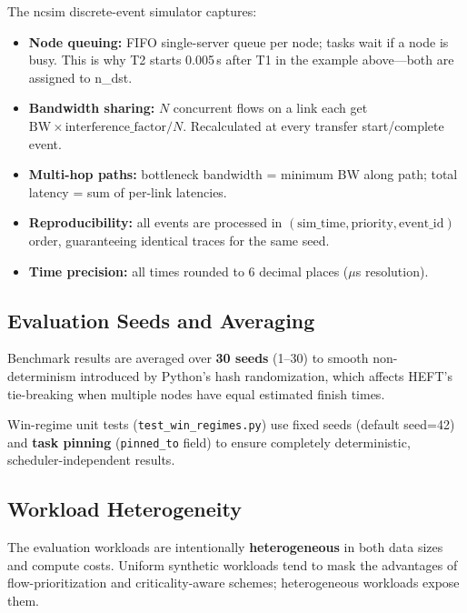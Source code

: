 \documentclass[11pt]{article}
\begin{document}
The ncsim discrete-event simulator captures:
\begin{itemize}
  \item \textbf{Node queuing:} FIFO single-server queue per node; tasks wait
        if a node is busy.  This is why T2 starts 0.005\,s after T1 in the
        example above---both are assigned to n\_dst.
  \item \textbf{Bandwidth sharing:} $N$ concurrent flows on a link each get
        $\text{BW} \times \text{interference\_factor} / N$.  Recalculated
        at every transfer start/complete event.
  \item \textbf{Multi-hop paths:} bottleneck bandwidth = minimum BW along
        path; total latency = sum of per-link latencies.
  \item \textbf{Reproducibility:} all events are processed in
        $(\text{sim\_time}, \text{priority}, \text{event\_id})$ order,
        guaranteeing identical traces for the same seed.
  \item \textbf{Time precision:} all times rounded to 6 decimal places
        ($\mu$s resolution).
\end{itemize}

\subsection{Evaluation Seeds and Averaging}

Benchmark results are averaged over \textbf{30 seeds} (1--30) to smooth
non-determinism introduced by Python's hash randomization, which affects
HEFT's tie-breaking when multiple nodes have equal estimated finish times.

Win-regime unit tests (\texttt{test\_win\_regimes.py}) use fixed seeds
(default seed=42) and \textbf{task pinning} (\texttt{pinned\_to} field)
to ensure completely deterministic, scheduler-independent results.

\subsection{Workload Heterogeneity}

The evaluation workloads are intentionally \textbf{heterogeneous} in both
data sizes and compute costs.  Uniform synthetic workloads tend to mask
the advantages of flow-prioritization and criticality-aware schemes;
heterogeneous workloads expose them.
\end{document}
